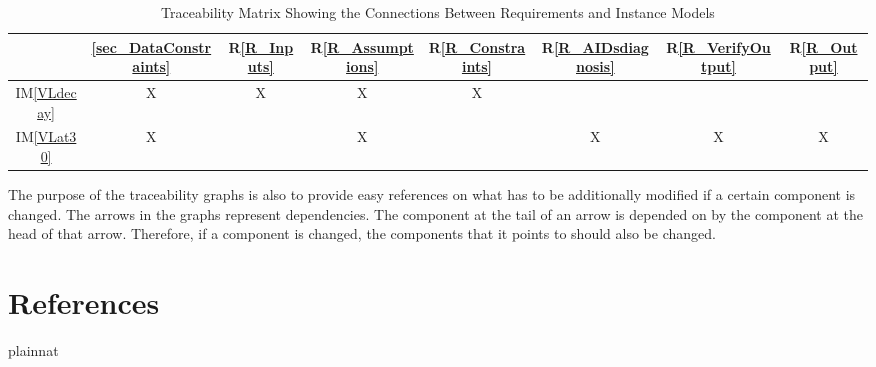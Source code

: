 \documentclass[12pt]{article}
\newcommand{\iref}[1]{IM\ref{#1}}
\newcommand{\rref}[1]{R\ref{#1}}
\begin{document}
\begin{table}[h!]
\centering
\begin{tabular}{|c|c|c|c|c|c|c|c|}
\hline
	& \ref{sec_DataConstraints}& \rref{R_Inputs}& 
\rref{R_Assumptions}& \rref{R_Constraints}& \rref{R_AIDsdiagnosis}& 
\rref{R_VerifyOutput}& \rref{R_Output} 
\\
\hline
\iref{VLdecay}         	&X &X &X &X & & & \\ \hline
\iref{VLat30}			&X & &X & &X &X &X  \\ 
\hline
\end{tabular}
\caption{Traceability Matrix Showing the Connections Between Requirements and 
Instance Models}
\label{Table:R_trace}
\end{table}

The purpose of the traceability graphs is also to provide easy references on
what has to be additionally modified if a certain component is changed.  The
arrows in the graphs represent dependencies. The component at the tail of an
arrow is depended on by the component at the head of that arrow. Therefore, if a
component is changed, the components that it points to should also be
changed. 


\newpage

\section{References}

 {plainnat}


\newpage
\end{document}
